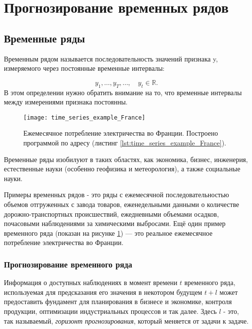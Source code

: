\section{Прогнозирование временных рядов}

\subsection{Временные ряды}

Временным рядом называется последовательность значений признака y, измеряемого 
через постоянные временные интервалы:

\begin{equation*}
    y_1, \dots, y_T, \dots, \quad y_t \in \mathbb{R}.
\end{equation*}
В этом определении нужно обратить внимание на то, что временные интервалы между 
измерениями признака постоянны.\\[-0.5em]

\begin{figure}[h!]
    \centering
    \texttt{[image: time\_series\_example\_France]}
    \caption{Ежемесячное потребление электричества во Франции. 
    Построено программой по адресу (листинг \ref{lst:time_series_example_France}).}
    \label{fig:time_series_example_France}
\end{figure}

Временные ряды изобилуют в таких
областях, как экономика, бизнес, инженерия, естественные науки 
(особенно геофизика и метеорология), а также социальные науки.

Примеры временных рядов - это ряды с  
ежемесячной последовательностью объемов отгруженных с завода товаров, 
еженедельными данными о количестве дорожно-транспортных происшествий, 
ежедневными объемами осадков, почасовыми наблюдениями за химическими 
выбросами. Ещё один пример временного ряда 
(показан на рисунке \ref{fig:time_series_example_France}) — это реальное 
ежемесячное потребление электричества во Франции.

\subsubsection{Прогнозирование временного ряда \cite{TSA_Box}}

Информация о доступных наблюдениях в момент времени $t$ временного ряда, 
используемая для предсказания его значения в некотором будущем $t+l$ может 
предоставить фундамент для планирования в бизнесе и экономике, контроля продукции, 
оптимизации индустриальных процессов и так далее. Здесь $l$ - это, так называемый, 
\textit{горизонт прогнозирования}, который меняется от задачи к задаче.

